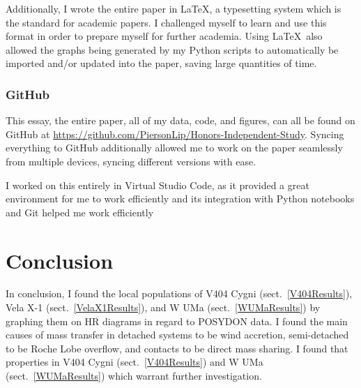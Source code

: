 \documentclass[12pt, a4paper]{article}
\begin{document}
            Additionally, I wrote the entire paper in \LaTeX, a typesetting system which is the standard for academic papers. I challenged myself to learn and use this format in order to prepare myself for further academia. Using \LaTeX~also allowed the graphs being generated by my Python scripts to automatically be imported and/or updated into the paper, saving large quantities of time.

        \subsubsection{GitHub}\label{GitHub}
            This essay, the entire paper, all of my data, code, and figures, can all be found on GitHub at \url{https://github.com/PiersonLip/Honors-Independent-Study}. Syncing everything to GitHub additionally allowed me to work on the paper seamlessly from multiple devices, syncing different versions with ease. 

            I worked on this entirely in Virtual Studio Code, as it provided a great environment for me to work efficiently and its integration with Python notebooks and Git helped me work efficiently

\section{Conclusion}
    In conclusion, I found the local populations of V404 Cygni (sect.~\ref{V404Results}), Vela X-1 (sect.~\ref{VelaX1Results}), and W UMa (sect.~\ref{WUMaResults}) by graphing them on HR diagrams in regard to POSYDON data. I found the main causes of mass transfer in detached systems to be wind accretion, semi-detached to be Roche Lobe overflow, and contacts to be direct mass sharing. I found that properties in V404 Cygni (sect.~\ref{V404Results}) and W UMa (sect.~\ref{WUMaResults}) which warrant further investigation.


    \pagebreak
\printbibliography[
heading=bibintoc,
title={\centering Works Cited}
]
\end{document}
